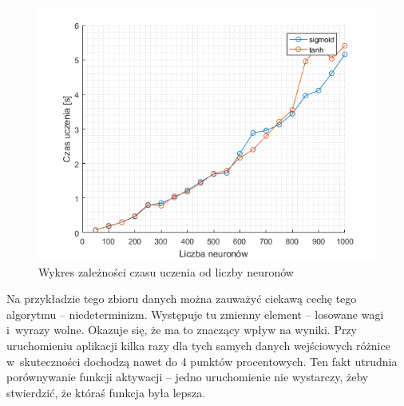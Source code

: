 \documentclass{article}
\begin{document}
\begin{figure}[H]
\centering
\includegraphics[width=\textwidth]{forest_wydajnosc.png}
\caption{Wykres zależności czasu uczenia od liczby neuronów}
\label{forest_wydajnosc}
\end{figure}

Na przykładzie tego zbioru danych można zauważyć ciekawą cechę tego algorytmu -- niedeterminizm.
Występuje tu zmienny element -- losowane wagi i~wyrazy wolne.
Okazuje się, że ma to znaczący wpływ na wyniki.
Przy uruchomieniu aplikacji kilka razy dla tych samych danych wejściowych różnice w~skuteczności dochodzą nawet do 4 punktów procentowych.
Ten fakt utrudnia porównywanie funkcji aktywacji -- jedno uruchomienie nie wystarczy, żeby stwierdzić, że któraś funkcja była lepsza.
\end{document}
